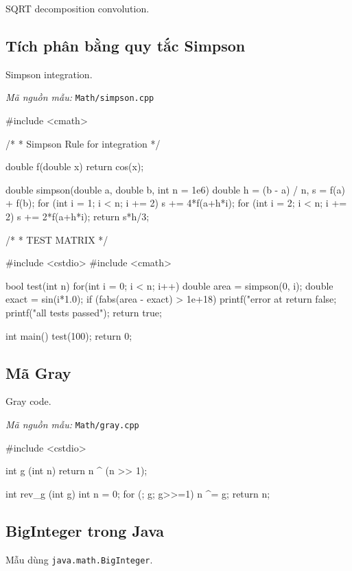 \documentclass[11pt]{article}
\newcommand{\codepath}[1]{\par\noindent\textit{Mã nguồn mẫu:} \texttt{#1}\par}
\begin{document}
SQRT decomposition convolution.

\subsection{Tích phân bằng quy tắc Simpson}

Simpson integration.

\codepath{Math/simpson.cpp}

\begingroup\scriptsize
\begin{vncode}
#include <cmath>

/*
 * Simpson Rule for integration
 */

double f(double x) { return cos(x); }

double simpson(double a, double b, int n = 1e6) {
	double h = (b - a) / n, s = f(a) + f(b);
	for (int i = 1; i < n; i += 2) s += 4*f(a+h*i);
	for (int i = 2; i < n; i += 2) s += 2*f(a+h*i);
	return s*h/3;
}

/*
 * TEST MATRIX
 */

#include <cstdio>
#include <cmath>

bool test(int n) {
	for(int i = 0; i < n; i++) {
		double area = simpson(0, i);
		double exact = sin(i*1.0);
		if (fabs(area - exact) > 1e+18) {
			printf("error at %
			return false;
		}
	}
	printf("all tests passed\n");
	return true;
}

int main() {
	test(100);
	return 0;
}
\end{vncode}
\endgroup


\subsection{Mã Gray}

Gray code.

\codepath{Math/gray.cpp}

\begingroup\scriptsize
\begin{vncode}
#include <cstdio>

int g (int n) {
	return n ^ (n >> 1);
}

int rev_g (int g) {
	int n = 0;
	for (; g; g>>=1)
		n ^= g;
	return n;
}
\end{vncode}
\endgroup


\subsection{BigInteger trong Java}

Mẫu dùng \texttt{java.math.BigInteger}.
\end{document}
